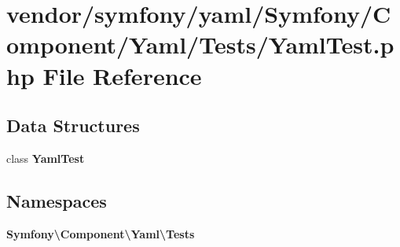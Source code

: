 \section{vendor/symfony/yaml/\+Symfony/\+Component/\+Yaml/\+Tests/\+Yaml\+Test.php File Reference}
\label{_yaml_test_8php}
\subsection*{Data Structures}
\begin{DoxyCompactItemize}
\item 
class {\bf Yaml\+Test}
\end{DoxyCompactItemize}
\subsection*{Namespaces}
\begin{DoxyCompactItemize}
\item 
 {\bf Symfony\textbackslash{}\+Component\textbackslash{}\+Yaml\textbackslash{}\+Tests}
\end{DoxyCompactItemize}
